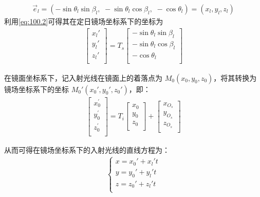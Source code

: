 \documentclass[../main.tex]{subfiles}
\begin{document}
\begin{align}\label{1.20}
\vec{e}_l=\left( -\sin \theta _l\sin \beta _l,\,\,-\sin \theta _l\cos \beta _l,\,\,-\cos \theta _l \right)=(x_l, y_l, z_l)
\end{align}
利用\eqref{eq:100.2}可得其在定日镜场坐标系下的坐标为
\begin{align}    \label{1.21}
\left[ \begin{matrix}
x_l'\\
y_l'\\
z_l'\\
\end{matrix} \right] =T_s\left[ \begin{matrix}
-\sin \theta_l \sin \beta_l\\
-\sin \theta_l \cos \beta_l\\
-\cos\theta_l\\
\end{matrix} \right]
\end{align}
\par 在镜面坐标系下，记入射光线在镜面上的着落点为 \( M_0(x_0, y_0, z_0) \)，将其转换为镜场坐标系下的坐标 \( M_0'(x_0', y_0', z_0') \)，即：
\begin{align}    \label{1.22}
\left[ \begin{array}{c}
x_{0}^{\prime}\\
y_{0}^{\prime}\\
z_{0}^{\prime}\\
\end{array} \right] =T_i\left[ \begin{array}{c}
x_0\\
y_0\\
z_0\\
\end{array} \right] +\left[ \begin{array}{c}
x_{O_s}\\
y_{O_s}\\
z_{O_s}\\
\end{array} \right] 
\end{align}
\par 从而可得在镜场坐标系下的入射光线的直线方程为：
\begin{align}    \label{1.23}
\begin{cases}
x = x_0' + x_l' t \\
y = y_0' + y_l' t \\
z = z_0' + z_l' t \\
\end{cases}
\end{align}
\end{document}
